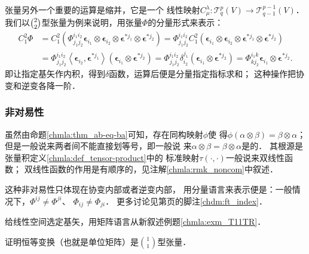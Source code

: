 张量另外一个重要的运算是{\heiti 缩并}，它是一个
线性映射$C^\lambda _\mu : \mathcal{T}^p_q(V) \to \mathcal{T}^{p-1}_{q-1}(V)$．
我们以$\binom{2}{2}$型张量为例来说明，用张量$\Phi$的分量形式来表示：
\begin{align*}
    C^2_1 \Phi & = C^2_1 \left(\Phi^{i_1 i_2} _{j_1 j_2}
    \boldsymbol{\epsilon}_{i_1} \otimes\boldsymbol{\epsilon}_{i_2} \otimes
    \boldsymbol{\epsilon}^{*j_1} \otimes \boldsymbol{\epsilon}^{*j_2}\right)
    = \Phi^{i_1 i_2} _{j_1 j_2} C^2_1 \left(
    \boldsymbol{\epsilon}_{i_1} \otimes\boldsymbol{\epsilon}_{i_2} \otimes
    \boldsymbol{\epsilon}^{*j_1} \otimes \boldsymbol{\epsilon}^{*j_2}\right)  \\
    &= \Phi^{i_1 i_2} _{j_1 j_2} \left<\boldsymbol{\epsilon}_{i_2},\boldsymbol{\epsilon}^{*j_1}\right>
    \left( \boldsymbol{\epsilon}_{i_1}  \otimes \boldsymbol{\epsilon}^{*j_2}\right)
    = \Phi^{i_1 i_2} _{j_1 j_2} \delta^{j_1}_{i_2}
    \left( \boldsymbol{\epsilon}_{i_1}  \otimes \boldsymbol{\epsilon}^{*j_2}\right)
    = \Phi^{i_1 k} _{k j_2}
       \boldsymbol{\epsilon}_{i_1}  \otimes \boldsymbol{\epsilon}^{*j_2} .
\end{align*}
即让指定基矢作内积，得到$\delta$函数，运算后便是分量指定指标求和；
这种操作把协变和逆变各降一阶．

\subsubsection*{非对易性}\label{chmla:sec_noncom}
虽然由命题\ref{chmla:thm_ab-eq-ba}可知，存在同构映射$\phi$使
得$\phi(\alpha \otimes \beta )=\beta \otimes \alpha$；
但是一般说来两者间不能直接划等号，即一般说
来$\alpha \otimes \beta =\beta \otimes \alpha$是的．
其根源是张量积定义\ref{chmla:def_tensor-product}中的
标准映射$\tau(\cdot, \cdot)$一般说来双线性函数；
双线性函数的作用是有顺序的，见注解\ref{chmla:rmk_noncom}中叙述．

这种非对易性只体现在协变内部或者逆变内部，
用分量语言来表示便是：一般情况下，$\Phi^{ij}\neq \Phi^{ji}$、
$\Phi_{ij}\neq \Phi_{ji}$．
更多讨论见第\pageref{chdm:ft_index}页的脚注\ref{chdm:ft_index}．


\begin{exercise}
	给线性空间选定基矢，用矩阵语言从新叙述例题\ref{chmla:exm_T11TR}．
\end{exercise}
\begin{exercise}
	证明恒等变换（也就是单位矩阵）是$\binom{1}{1}$型张量．
\end{exercise}


